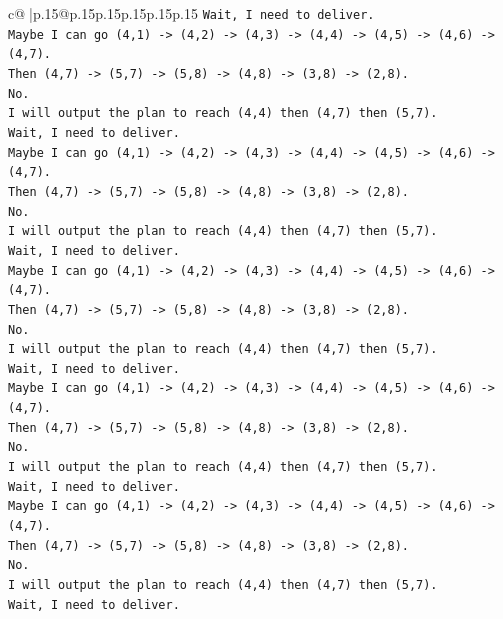 \documentclass{article}
\begin{document}
{\begin{supertabular}{c@{$\;$}|p{.15\linewidth}@{}p{.15\linewidth}p{.15\linewidth}p{.15\linewidth}p{.15\linewidth}p{.15\linewidth}}
{{{\texttt{Wait, I need to deliver.} \\
\texttt{Maybe I can go (4,1) {-}> (4,2) {-}> (4,3) {-}> (4,4) {-}> (4,5) {-}> (4,6) {-}> (4,7).} \\
\texttt{Then (4,7) {-}> (5,7) {-}> (5,8) {-}> (4,8) {-}> (3,8) {-}> (2,8).} \\
\texttt{No.} \\
\texttt{I will output the plan to reach (4,4) then (4,7) then (5,7).} \\
\texttt{Wait, I need to deliver.} \\
\texttt{Maybe I can go (4,1) {-}> (4,2) {-}> (4,3) {-}> (4,4) {-}> (4,5) {-}> (4,6) {-}> (4,7).} \\
\texttt{Then (4,7) {-}> (5,7) {-}> (5,8) {-}> (4,8) {-}> (3,8) {-}> (2,8).} \\
\texttt{No.} \\
\texttt{I will output the plan to reach (4,4) then (4,7) then (5,7).} \\
\texttt{Wait, I need to deliver.} \\
\texttt{Maybe I can go (4,1) {-}> (4,2) {-}> (4,3) {-}> (4,4) {-}> (4,5) {-}> (4,6) {-}> (4,7).} \\
\texttt{Then (4,7) {-}> (5,7) {-}> (5,8) {-}> (4,8) {-}> (3,8) {-}> (2,8).} \\
\texttt{No.} \\
\texttt{I will output the plan to reach (4,4) then (4,7) then (5,7).} \\
\texttt{Wait, I need to deliver.} \\
\texttt{Maybe I can go (4,1) {-}> (4,2) {-}> (4,3) {-}> (4,4) {-}> (4,5) {-}> (4,6) {-}> (4,7).} \\
\texttt{Then (4,7) {-}> (5,7) {-}> (5,8) {-}> (4,8) {-}> (3,8) {-}> (2,8).} \\
\texttt{No.} \\
\texttt{I will output the plan to reach (4,4) then (4,7) then (5,7).} \\
\texttt{Wait, I need to deliver.} \\
\texttt{Maybe I can go (4,1) {-}> (4,2) {-}> (4,3) {-}> (4,4) {-}> (4,5) {-}> (4,6) {-}> (4,7).} \\
\texttt{Then (4,7) {-}> (5,7) {-}> (5,8) {-}> (4,8) {-}> (3,8) {-}> (2,8).} \\
\texttt{No.} \\
\texttt{I will output the plan to reach (4,4) then (4,7) then (5,7).} \\
\texttt{Wait, I need to deliver.} \\
}}}
\end{supertabular}}
\end{document}
